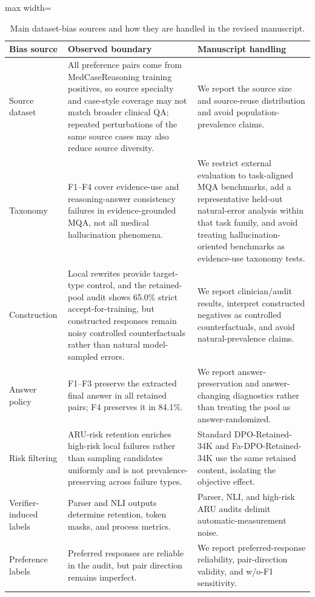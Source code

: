 \documentclass[a4paper,fleqn,doubleblind]{cas-sc}
\begin{document}
\begin{table}[htbp]
    \centering
    \footnotesize
    \caption{Main dataset-bias sources and how they are handled in the revised manuscript.}
    \label{tab:dataset_bias_sources}
    \begin{adjustbox}{max width=\textwidth}
    \begin{tabular}{p{}p{}p{}}
        \toprule
        \textbf{Bias source} & \textbf{Observed boundary} & \textbf{Manuscript handling} \\
        \midrule
        Source dataset & All preference pairs come from MedCaseReasoning training positives, so source specialty and case-style coverage may not match broader clinical QA; repeated perturbations of the same source cases may also reduce source diversity. & We report the source size and source-reuse distribution and avoid population-prevalence claims. \\
        Taxonomy & F1--F4 cover evidence-use and reasoning-answer consistency failures in evidence-grounded MQA, not all medical hallucination phenomena. & We restrict external evaluation to task-aligned MQA benchmarks, add a representative held-out natural-error analysis within that task family, and avoid treating hallucination-oriented benchmarks as evidence-use taxonomy tests. \\
        Construction & Local rewrites provide target-type control, and the retained-pool audit shows 65.0\% strict accept-for-training, but constructed responses remain noisy controlled counterfactuals rather than natural model-sampled errors. & We report clinician/audit results, interpret constructed negatives as controlled counterfactuals, and avoid natural-prevalence claims. \\
        Answer policy & F1--F3 preserve the extracted final answer in all retained pairs; F4 preserves it in 84.1\%. & We report answer-preservation and answer-changing diagnostics rather than treating the pool as answer-randomized. \\
        Risk filtering & ARU-risk retention enriches high-risk local failures rather than sampling candidates uniformly and is not prevalence-preserving across failure types. & Standard DPO-Retained-34K and Fa-DPO-Retained-34K use the same retained content, isolating the objective effect. \\
        Verifier-induced labels & Parser and NLI outputs determine retention, token masks, and process metrics. & Parser, NLI, and high-risk ARU audits delimit automatic-measurement noise. \\
        Preference labels & Preferred responses are reliable in the audit, but pair direction remains imperfect. & We report preferred-response reliability, pair-direction validity, and w/o-F1 sensitivity. \\
        \bottomrule
    \end{tabular}
    \end{adjustbox}
\end{table}
\end{document}
